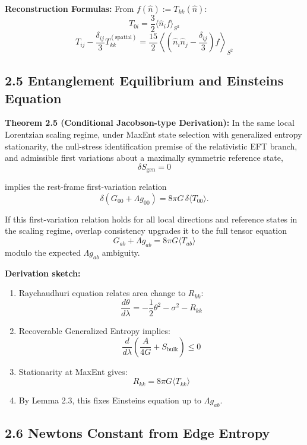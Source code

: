 \textbf{Reconstruction Formulas:} From \(f(\hat{n}) := T_{kk}(\hat{n})\): \[T_{0i} = \frac{3}{2}\langle \hat{n}_i f \rangle_{S^2}\] \[T_{ij} - \frac{\delta_{ij}}{3}T^{(\text{spatial})}_{kk} = \frac{15}{2}\left\langle \left(\hat{n}_i \hat{n}_j - \frac{\delta_{ij}}{3}\right) f \right\rangle_{S^2}\]

\subsection{2.5 Entanglement Equilibrium and Einstein\textquotesingle s Equation}\label{25-entanglement-equilibrium-and-einsteins-equation}

\textbf{Theorem 2.5 (Conditional Jacobson-type Derivation):} In the same local Lorentzian scaling regime, under MaxEnt state selection with generalized entropy stationarity, the null-stress identification premise of the relativistic EFT branch, and admissible first variations about a maximally symmetric reference state,
\[\delta S_{\text{gen}} = 0\]

implies the rest-frame first-variation relation
\[
\delta\!\left(G_{00} + \Lambda g_{00}\right) = 8\pi G \,\delta\langle T_{00} \rangle.
\]

If this first-variation relation holds for all local directions and reference states in the scaling regime, overlap consistency upgrades it to the full tensor equation
\[
G_{ab} + \Lambda g_{ab} = 8\pi G \langle T_{ab} \rangle
\]
modulo the expected \(\Lambda g_{ab}\) ambiguity.

\textbf{Derivation sketch:}

\begin{enumerate}
\def\labelenumi{\arabic{enumi}.}
\item
  Raychaudhuri equation relates area change to \(R_{kk}\): \[\frac{d\theta}{d\lambda} = -\frac{1}{2}\theta^2 - \sigma^2 - R_{kk}\]
\item
  Recoverable Generalized Entropy implies: \[\frac{d}{d\lambda}\left(\frac{A}{4G} + S_{\text{bulk}}\right) \leq 0\]
\item
  Stationarity at MaxEnt gives: \[R_{kk} = 8\pi G \langle T_{kk} \rangle\]
\item
  By Lemma 2.3, this fixes Einstein\textquotesingle s equation up to \(\Lambda g_{ab}\).
\end{enumerate}

\subsection{2.6 Newton\textquotesingle s Constant from Edge Entropy}\label{26-newtons-constant-from-edge-entropy}

